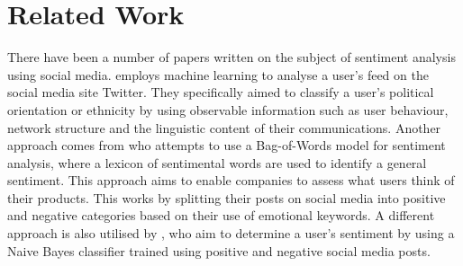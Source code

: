 \section{Related Work} There have been a number of papers written on
the subject of sentiment analysis using social media.
 employs machine learning to analyse a
user's feed on the social media site Twitter. They specifically aimed to
classify a user's political orientation or ethnicity by using observable
information such as user behaviour, network structure and the linguistic content
of their communications. Another approach comes from  who
attempts to use a Bag-of-Words model for sentiment analysis, where a lexicon of
sentimental words are used to identify a general sentiment.
This approach aims to enable companies to assess what users think of their
products. This works by splitting their posts on social media into positive and
negative categories based on their use of emotional keywords. A different
approach is also utilised by , who aim to determine a
user's sentiment by using a Naive Bayes classifier trained using positive and
negative social media posts.